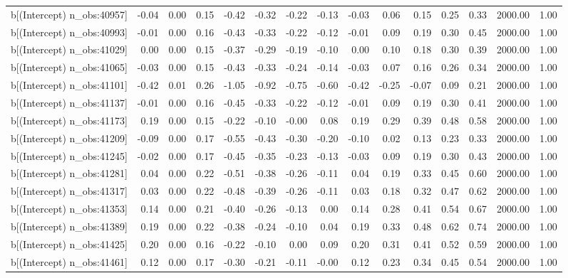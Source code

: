 \begin{table}[ht]
\begin{tabular}{rrrrrrrrrrrrrrr}
  b[(Intercept) n\_obs:40957] & -0.04 & 0.00 & 0.15 & -0.42 & -0.32 & -0.22 & -0.13 & -0.03 & 0.06 & 0.15 & 0.25 & 0.33 & 2000.00 & 1.00 \\ 
  b[(Intercept) n\_obs:40993] & -0.01 & 0.00 & 0.16 & -0.43 & -0.33 & -0.22 & -0.12 & -0.01 & 0.09 & 0.19 & 0.30 & 0.45 & 2000.00 & 1.00 \\ 
  b[(Intercept) n\_obs:41029] & 0.00 & 0.00 & 0.15 & -0.37 & -0.29 & -0.19 & -0.10 & 0.00 & 0.10 & 0.18 & 0.30 & 0.39 & 2000.00 & 1.00 \\ 
  b[(Intercept) n\_obs:41065] & -0.03 & 0.00 & 0.15 & -0.43 & -0.33 & -0.24 & -0.14 & -0.03 & 0.07 & 0.16 & 0.26 & 0.34 & 2000.00 & 1.00 \\ 
  b[(Intercept) n\_obs:41101] & -0.42 & 0.01 & 0.26 & -1.05 & -0.92 & -0.75 & -0.60 & -0.42 & -0.25 & -0.07 & 0.09 & 0.21 & 2000.00 & 1.00 \\ 
  b[(Intercept) n\_obs:41137] & -0.01 & 0.00 & 0.16 & -0.45 & -0.33 & -0.22 & -0.12 & -0.01 & 0.09 & 0.19 & 0.30 & 0.41 & 2000.00 & 1.00 \\ 
  b[(Intercept) n\_obs:41173] & 0.19 & 0.00 & 0.15 & -0.22 & -0.10 & -0.00 & 0.08 & 0.19 & 0.29 & 0.39 & 0.48 & 0.58 & 2000.00 & 1.00 \\ 
  b[(Intercept) n\_obs:41209] & -0.09 & 0.00 & 0.17 & -0.55 & -0.43 & -0.30 & -0.20 & -0.10 & 0.02 & 0.13 & 0.23 & 0.33 & 2000.00 & 1.00 \\ 
  b[(Intercept) n\_obs:41245] & -0.02 & 0.00 & 0.17 & -0.45 & -0.35 & -0.23 & -0.13 & -0.03 & 0.09 & 0.19 & 0.30 & 0.43 & 2000.00 & 1.00 \\ 
  b[(Intercept) n\_obs:41281] & 0.04 & 0.00 & 0.22 & -0.51 & -0.38 & -0.26 & -0.11 & 0.04 & 0.19 & 0.33 & 0.45 & 0.60 & 2000.00 & 1.00 \\ 
  b[(Intercept) n\_obs:41317] & 0.03 & 0.00 & 0.22 & -0.48 & -0.39 & -0.26 & -0.11 & 0.03 & 0.18 & 0.32 & 0.47 & 0.62 & 2000.00 & 1.00 \\ 
  b[(Intercept) n\_obs:41353] & 0.14 & 0.00 & 0.21 & -0.40 & -0.26 & -0.13 & 0.00 & 0.14 & 0.28 & 0.41 & 0.54 & 0.67 & 2000.00 & 1.00 \\ 
  b[(Intercept) n\_obs:41389] & 0.19 & 0.00 & 0.22 & -0.38 & -0.24 & -0.10 & 0.04 & 0.19 & 0.33 & 0.48 & 0.62 & 0.74 & 2000.00 & 1.00 \\ 
  b[(Intercept) n\_obs:41425] & 0.20 & 0.00 & 0.16 & -0.22 & -0.10 & 0.00 & 0.09 & 0.20 & 0.31 & 0.41 & 0.52 & 0.59 & 2000.00 & 1.00 \\ 
  b[(Intercept) n\_obs:41461] & 0.12 & 0.00 & 0.17 & -0.30 & -0.21 & -0.11 & -0.00 & 0.12 & 0.23 & 0.34 & 0.45 & 0.54 & 2000.00 & 1.00 \\ 

\end{tabular}
\end{table}
